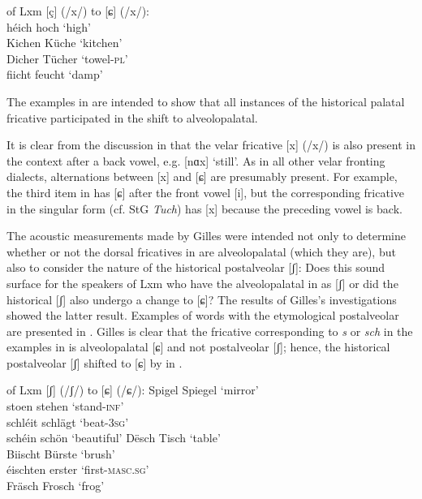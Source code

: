 \begin{xlist}
\ea%
\label{ex:10:25} of Lxm [ç] (/x/) to [ɕ] (/x/):\\
  héich  \tab hoch    \tab ‘high’     \\
  Kichen \tab  Küche  \tab ‘kitchen’  \\
  Dicher \tab  Tücher \tab  ‘towel-\textsc{pl}’  \\
  fiicht \tab  feucht \tab  ‘damp’    \\
\z 

The examples in  are intended to show that all instances of the historical palatal fricative  participated in the shift to alveolopalatal.

It is clear from the discussion in \citet{Gilles1999} that the velar fricative [x] (/x/) is also present in the context after a back vowel, e.g. [nɑx] ‘still’. As in all other velar fronting dialects, alternations between [x] and [ɕ] are presumably present. For example, the third item in  has [ɕ] after the front vowel [i], but the corresponding fricative in the singular form (cf. StG \textit{Tuch}) has [x] because the preceding vowel is back.\largerpage

The acoustic measurements made by Gilles were intended not only to determine whether or not the dorsal fricatives in  are alveolopalatal (which they are), but also to consider the nature of the historical postalveolar  [ʃ]: Does this sound surface for the speakers of Lxm who have the alveolopalatal in  as [ʃ] or did the historical [ʃ] also undergo a change to [ɕ]? The results of Gilles’s investigations showed the latter result. Examples of words with the etymological postalveolar are presented in . Gilles is clear that the fricative corresponding to \textit{s} or \textit{sch} in the examples in  is alveolopalatal [ɕ] and not postalveolar [ʃ]; hence, the historical postalveolar [ʃ] shifted to [ɕ] by  in .

\ea%
\label{ex:10:26} of Lxm [ʃ] (/ʃ/) to [ɕ] (/ɕ/):
\ea\label{ex:10:26a} Spigel \tab  Spiegel \tab ‘mirror’ \\
    stoen \tab  stehen \tab ‘stand\textsc{{}-inf}’ \\
    schléit \tab  schlägt \tab ‘beat\textsc{{}-3sg}’ \\
    schéin \tab  schön \tab ‘beautiful’ 
\ex\label{ex:10:26b} Dësch \tab  Tisch \tab ‘table’ \\
    Biischt \tab  Bürste \tab ‘brush’ \\
    éischten \tab  erster \tab ‘first\textsc{{}-masc.sg}’ \\
    Fräsch \tab  Frosch \tab ‘frog’ 
    \z 
\z


\end{xlist}
